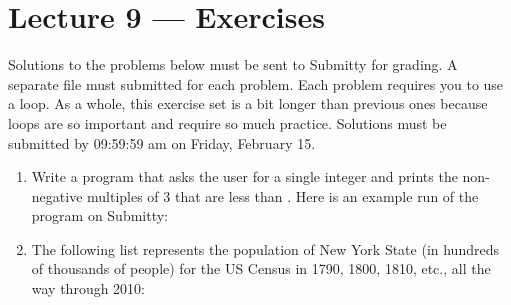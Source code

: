 \documentclass[letterpaper,10pt,english]{sphinxmanual}
\begin{document}
\chapter{Lecture 9 — Exercises}
\label{\detokenize{lecture_notes/lec09_loops1_while_exercises/exercises:lecture-9-exercises}}\label{\detokenize{lecture_notes/lec09_loops1_while_exercises/exercises::doc}}
Solutions to the problems below must be sent to Submitty for grading.
A separate file must submitted for each problem. Each problem
requires you to use a  loop. As a whole, this exercise set is a
bit longer than previous ones because loops are so important and
require so much practice. Solutions must be submitted by 09:59:59 am on
Friday, February 15.
\begin{enumerate}
\def\theenumi{\arabic{enumi}}
\def\labelenumi{\theenumi .}
\makeatletter\def\p@enumii{\p@enumi \theenumi .}\makeatother
\item {} 
Write a program that asks the user for a single integer  and
prints the non-negative multiples of 3 that are less than .
Here is an example run of the program on Submitty:

\begin{sphinxVerbatim}[commandchars=\\\{\}]
    
\end{sphinxVerbatim}

\item {} 
The following list represents the population of New York State (in
hundreds of thousands of people) for the US Census in 1790, 1800,
1810, etc., all the way through 2010:

\begin{sphinxVerbatim}[commandchars=\\\{\}]
  \PYG{p}{[}          \PYGZbs{}
                    \PYGZbs{}
                \PYG{p}{]}
\end{sphinxVerbatim}


\end{enumerate}
\end{document}
